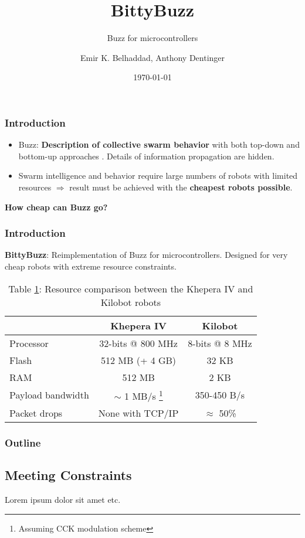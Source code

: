 \documentclass{beamer}
\title{BittyBuzz}
\subtitle{Buzz for microcontrollers}
\author{Emir K. Belhaddad, Anthony Dentinger}
\date{\today}
\begin{document}
	\begin{frame}
		\titlepage
	\end{frame}
	\begin{frame}
		\frametitle{Introduction}
		\begin{itemize}
			\item Buzz: \textbf{Description of collective swarm behavior} with both top-down and bottom-up approaches \cite{buzz_arxiv}. Details of information propagation are hidden.
			\item Swarm intelligence and behavior require large numbers of robots with limited resources $\Rightarrow$ result must be achieved with the \textbf{cheapest robots possible}.
		\end{itemize}

		\centering \Large
		\textbf{How cheap can Buzz go?}
	\end{frame}
	\begin{frame}
		\frametitle{Introduction}
		\textbf{BittyBuzz}: Reimplementation of Buzz for microcontrollers. Designed for very cheap robots with extreme resource constraints.
		
		\begin{table}
			\begin{tabular}{l|c|c}
				                  & Khepera IV        & Kilobot\\
                \hline
				Processor         & 32-bits @ 800 MHz & 8-bits @ 8 MHz\\
				Flash             & 512 MB (+ 4 GB)   & 32 KB\\
				RAM               & 512 MB            & 2 KB\\
				Payload bandwidth & $\sim$ 1 MB/s \footnote{Assuming CCK modulation scheme} \cite{khepera_wifi}  & 350-450 B/s\\
				Packet drops      & None with TCP/IP  & $\approx$ 50\%
			\end{tabular}
			\caption{
				\label{table:khepera kilobot comparison}Table \ref{table:khepera kilobot comparison}: Resource comparison between the Khepera IV and Kilobot robots \cite{khepera_specs}}
		\end{table}
	\end{frame}
	\begin{frame}
		\frametitle{Outline}
		\tableofcontents
	\end{frame}
	\begin{frame}
		\section{Meeting Constraints}
		Lorem ipsum dolor sit amet etc.
	\end{frame}
\end{document}
